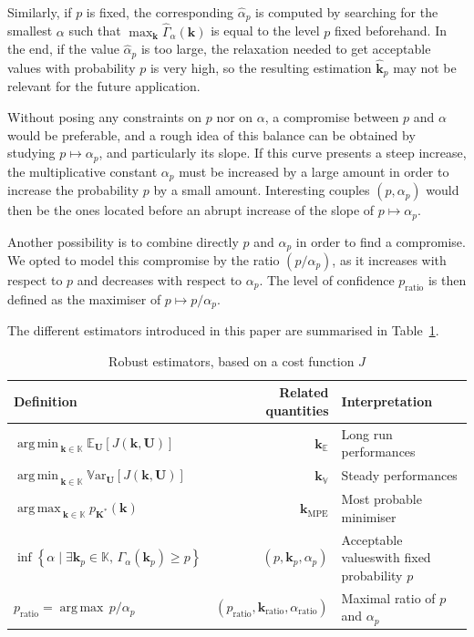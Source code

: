 \documentclass[preprint, 1p]{elsarticle}
\DeclareMathOperator*{\argmin}{arg\,min \,}
\DeclareMathOperator*{\argmax}{arg\,max \,}
\newcommand{\Var}{\mathbb{V}\textrm{ar}}
\newcommand{\Ex}{\mathbb{E}}
\newcommand{\kmean}{{\mathbf{k}}_{\Ex}}
\newcommand{\kvar}{{\mathbf{k}}_{\mathbb{V}}}
\newcommand{\kmpe}{{\mathbf{k}}_{\mathrm{MPE}}}
\newcommand{\checkap}{{\alpha}_p}
\newcommand{\checka}{{\alpha}}
\newcommand{\checkk}{\mathbf{k}}
\newcommand{\checkkp}{{\mathbf{k}}_p}
\newcommand{\Kspace}{\mathbb{K}}
\newcommand{\victor}[1]{{\itshape\color{green} ({#1})}}
\begin{document}
Similarly, if $p$ is fixed, the corresponding $\hat{\checka}_p$ is computed by searching for the smallest $\alpha$ such that $\max_{\mathbf{k}} \hat{\Gamma}_{\alpha}(\mathbf{k})$ is equal to the level $p$ fixed beforehand. In the end, if the value $\hat{\checka}_p$ is too large, the relaxation needed to get acceptable values with probability $p$ is very high, so the resulting estimation $\hat{\checkk}_p$ may not be relevant for the future application.


Without posing any constraints on $p$ nor on $\alpha$, a compromise between $p$ and $\alpha$ would be preferable, and a rough idea of this balance can be obtained by studying $p \mapsto \checkap$, and particularly its slope.
If this curve presents a steep increase, the multiplicative constant $\checkap$ must be increased by a large amount in order to increase the probability $p$ by a small amount. Interesting couples $(p,\checkap)$ would then be the ones located before an abrupt increase of the slope of $p \mapsto \checkap$.

Another possibility is to combine directly $p$ and $\checkap$ in order to find a compromise. We opted to model this compromise by the ratio $(p/\checkap)$, as it increases with respect to $p$ and decreases with respect to $\checka_p$. The level of confidence $p_{\mathrm{ratio}}$ is then defined as the maximiser of $p\mapsto p / \checka_p$.



The different estimators introduced in this paper are summarised in Table~\ref{tab:RO_recap}.

\begin{table}[t]
  \centering
\begin{tabular}{lrp{5cm}}
  \toprule
  Definition & Related quantities & Interpretation \\ \midrule
   $\argmin_{\mathbf{k}\in\Kspace} \Ex_{\mathbf{U}}\left[J(\mathbf{k},\mathbf{U})\right]$& $\kmean$ & Long run performances\\
   $\argmin_{\mathbf{k}\in\Kspace} \Var_{\mathbf{U}}\left[J(\mathbf{k},\mathbf{U})\right]$& $\kvar$  & Steady performances\\
   $\argmax_{\mathbf{k}\in\Kspace} p_{\mathbf{K}^*}(\mathbf{k})$ & $\kmpe$ & Most probable minimiser\\
    $\inf\left\{ \alpha \mid \exists \checkkp \in \Kspace,\, \Gamma_{\alpha}(\checkkp) \geq p \right\}$ & $(p, \checkkp,\checkap)$ & Acceptable values\newline with fixed probability $p$ \\
    $p_{\mathrm{ratio}} = \argmax p/\checkap$ & $(p_{\mathrm{ratio}}, \checkk_{\mathrm{ratio}}, \checka_{\mathrm{ratio}})$ & Maximal ratio of $p$ and $\checkap$ \\
  \bottomrule
\end{tabular}
\caption{Robust estimators, based on a cost function $J$}
\label{tab:RO_recap}
\end{table}
\end{document}
